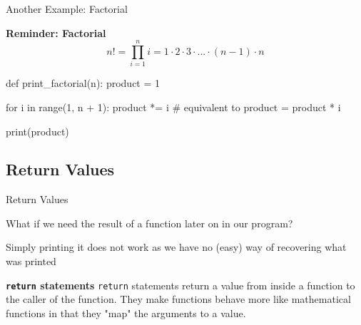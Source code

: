 \begin{frame}[fragile]{Another Example: Factorial}

    \begin{alertblock}{\textbf{Reminder: Factorial}}
        $$ n! = \prod_{i=1}^n i = 1 \cdot 2 \cdot 3 \cdot ... \cdot (n - 1) \cdot n $$
    \end{alertblock}

    \begin{pythoncode}
    def print_factorial(n):
        product = 1

        for i in range(1, n + 1):
            product *= i
            # equivalent to product = product * i

        print(product)
    \end{pythoncode}


\end{frame}


\subsection{Return Values}

\begin{frame}{Return Values}

    \begin{block}{}
        What if we need the result of a function later on in our program?
    \end{block}

    Simply printing it does not work as we have no (easy) way of recovering what was printed

    \pause
    \vspace{1em}

    \begin{alertblock}{\textbf{\texttt{return} statements}}
        \texttt{return} statements return a value from inside a function to the caller of the function. They make functions behave more like mathematical functions in that they "map" the arguments to a value.
    \end{alertblock}


\end{frame}

